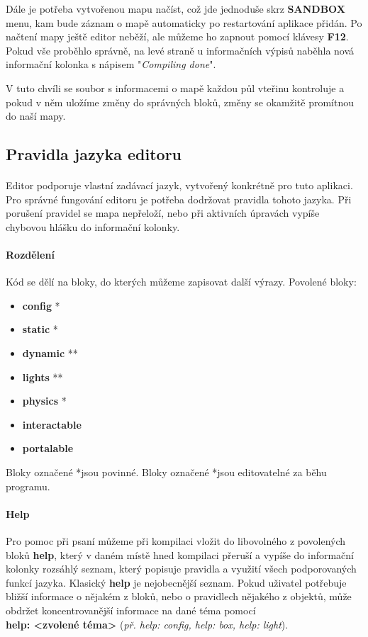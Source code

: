 \documentclass[a4paper, 12pt]{article}
\begin{document}
Dále je potřeba vytvořenou mapu načíst, což jde jednoduše skrz \textbf{SANDBOX}
menu, kam bude záznam o mapě automaticky po restartování aplikace přidán.
Po načtení mapy ještě editor neběží, ale můžeme ho zapnout pomocí klávesy
\textbf{F12}. Pokud vše proběhlo správně, na levé straně u informačních výpisů
naběhla nová informační kolonka s nápisem "\emph{Compiling done}".

V tuto chvíli se soubor s informacemi o mapě každou půl vteřinu kontroluje a
pokud v něm uložíme změny do správných bloků, změny se okamžitě promítnou do
naší mapy. 

\subsection{Pravidla jazyka editoru}
\paragraph{}
Editor podporuje vlastní zadávací jazyk, vytvořený konkrétně pro tuto aplikaci.
Pro správné fungování editoru je potřeba dodržovat pravidla tohoto jazyka. Při
porušení pravidel se mapa nepřeloží, nebo při aktivních úpravách vypíše
chybovou hlášku do informační kolonky.

\paragraph{Rozdělení}
Kód se dělí na bloky, do kterých můžeme zapisovat další výrazy.
Povolené bloky: 
\begin{itemize}
    \item \textbf{config} \color{red}*\normalcolor 
    \item \textbf{static} \color{red}*\normalcolor 
    \item \textbf{dynamic} \color{red}*\normalcolor \color{blue}*\normalcolor
    \item \textbf{lights} \color{red}*\normalcolor \color{blue}*\normalcolor
    \item \textbf{physics} \color{blue}*\normalcolor
    \item \textbf{interactable}
    \item \textbf{portalable}
\end{itemize}
Bloky označené \color{red}*\normalcolor jsou povinné. Bloky označené
\color{blue}*\normalcolor jsou editovatelné za běhu programu.

\paragraph{Help}
Pro pomoc při psaní můžeme při kompilaci vložit do libovolného z povolených
bloků \textbf{help}, který v daném místě hned kompilaci přeruší a vypíše do
informační kolonky rozsáhlý seznam, který popisuje pravidla a využití všech
podporovaných funkcí jazyka. Klasický \textbf{help} je nejobecnější seznam.
Pokud uživatel potřebuje bližší informace o nějakém z bloků, nebo o pravidlech 
nějakého z objektů, může obdržet koncentrovanější informace na dané téma pomocí
\\\textbf{help: <zvolené téma>} (\emph{př. help: config, help: box, help: light}).
\end{document}
